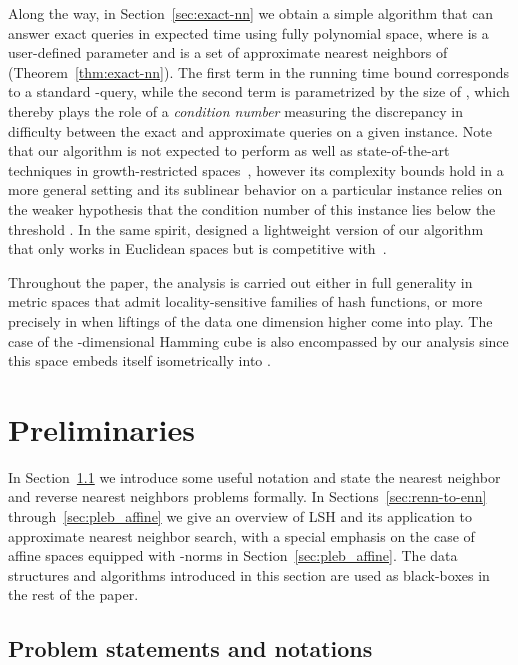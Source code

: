 Along the way, in Section~\ref{sec:exact-nn} we obtain a simple
algorithm that can answer exact \nn queries in expected  time using
fully polynomial space, where  is a user-defined parameter and
 is a set of approximate nearest neighbors of 
(Theorem~\ref{thm:exact-nn}). The first term in the running time bound
corresponds to a standard -\nn query, while the second term is
parametrized by the size of , which thereby plays
the role of a {\em condition number} measuring the discrepancy in
difficulty between the exact and approximate \nn queries on a given
instance. Note that our algorithm is not expected to perform as well
as state-of-the-art techniques in growth-restricted
spaces~\cite{Clarkson99, hkmr-nnngrm-04, kr-fnngrm-02, kl-ns-04},
however its complexity bounds hold in a more general setting and its
sublinear behavior on a particular instance relies on the weaker
hypothesis that the condition number of this instance lies below the
threshold . In the same spirit, \citet{DIIM04} designed a
lightweight version of our algorithm that only works in Euclidean
spaces but is competitive with~\cite{Clarkson99, hkmr-nnngrm-04,
  kr-fnngrm-02, kl-ns-04}.

Throughout the paper, the analysis is carried out either in full
generality in metric spaces that admit locality-sensitive families of
hash functions, or more precisely in  when liftings of
the data one dimension higher come into play.  The case of the
-dimensional Hamming cube is also encompassed by our analysis since
this space embeds itself isometrically into .


\section{Preliminaries}\label{sec:prelim}

In Section~\ref{sec:defs} we introduce some useful notation and state
the nearest neighbor and reverse nearest neighbors problems
formally. In Sections~\ref{sec:renn-to-enn}
through~\ref{sec:pleb_affine} we give an overview of LSH and its
application to approximate nearest neighbor search, with a special
emphasis on the case of affine spaces  equipped with
-norms in Section~\ref{sec:pleb_affine}. The data structures
and algorithms introduced in this section are used as black-boxes in
the rest of the paper.

\subsection{Problem statements and notations}
\label{sec:defs}

